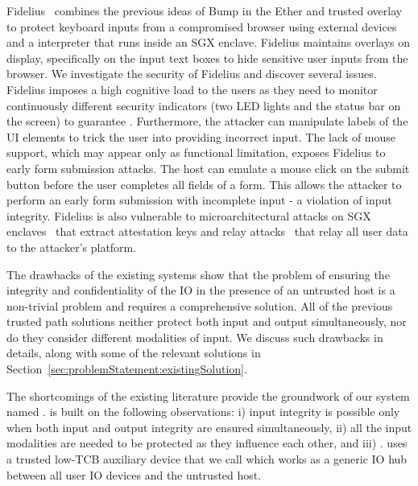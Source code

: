 Fidelius~\cite{Fidelius} combines the previous ideas of Bump in the Ether and trusted overlay to protect keyboard inputs from a compromised browser using external devices and a \js interpreter that runs inside an SGX enclave. Fidelius maintains overlays on display, specifically on the input text boxes to hide sensitive user inputs from the browser. We investigate the security of Fidelius and discover several issues. Fidelius imposes a high cognitive load to the users as they need to monitor continuously different security indicators (two LED lights and the status bar on the screen) to guarantee . Furthermore, the attacker can manipulate labels of the UI elements to trick the user into providing incorrect input. 
The lack of mouse support, which may appear only as functional limitation, exposes Fidelius to early form submission attacks. The host can emulate a mouse click on the submit button before the user completes all fields of a form.
This allows the attacker to perform an early form submission with incomplete input - a violation of input integrity. Fidelius is also vulnerable to microarchitectural attacks on SGX enclaves~\cite{van2018foreshadow} that extract attestation keys and relay attacks~\cite{dhar2018proximitee} that relay all user data to the attacker's platform.

The drawbacks of the existing systems show that the problem of ensuring the integrity and confidentiality of the IO in the presence of an untrusted host is a non-trivial problem and requires a comprehensive solution. All of the previous trusted path solutions neither protect both input and output simultaneously, nor do they consider different modalities of input. We discuss such drawbacks in details, along with some of the relevant solutions in Section~\ref{sec:problemStatement:existingSolution}.

 
 The shortcomings of the existing literature provide the groundwork of our system named \name.
\name is built on the following observations: i) input integrity is possible only when both input and output integrity are ensured simultaneously, ii) all the input modalities are needed to be protected as they influence each other, and iii) . \name uses a trusted low-TCB auxiliary device that we call \device which works as a generic IO hub between all user IO devices and the untrusted host. 

